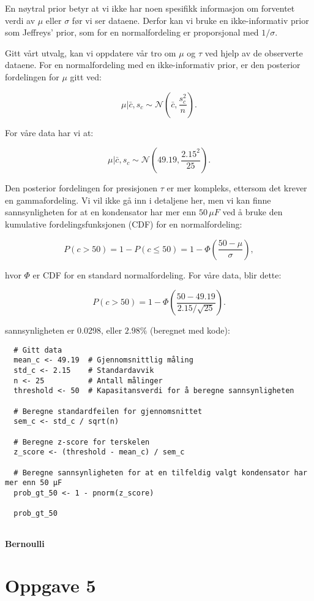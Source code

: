 \documentclass{article}
\begin{document}
En nøytral prior betyr at vi ikke har noen spesifikk informasjon om forventet verdi av \(\mu\) eller \(\sigma\) før vi ser dataene. Derfor kan vi bruke en ikke-informativ prior som Jeffreys' prior, som for en normalfordeling er proporsjonal med \(1/\sigma\).

Gitt vårt utvalg, kan vi oppdatere vår tro om \(\mu\) og \(\tau\) ved hjelp av de observerte dataene. For en normalfordeling med en ikke-informativ prior, er den posterior fordelingen for \(\mu\) gitt ved:

\[
\mu | \bar{c}, s_c \sim \mathcal{N}\left(\bar{c}, \frac{s_c^2}{n}\right).
\]

For våre data har vi at:

\[
\mu | \bar{c}, s_c \sim \mathcal{N}\left(49.19, \frac{2.15^2}{25}\right).
\]

Den posterior fordelingen for presisjonen \(\tau\) er mer kompleks, ettersom det krever en gammafordeling. Vi vil ikke gå inn i detaljene her, men vi kan finne sannsynligheten for at en kondensator har mer enn \(50 \, \mu F\) ved å bruke den kumulative fordelingsfunksjonen (CDF) for en normalfordeling:

\[
P(c > 50) = 1 - P(c \leq 50) = 1 - \Phi\left(\frac{50 - \mu}{\sigma}\right),
\]

hvor \(\Phi\) er CDF for en standard normalfordeling. For våre data, blir dette:

\[
P(c > 50) = 1 - \Phi\left(\frac{50 - 49.19}{2.15/\sqrt{25}}\right).
\]

sannsynligheten er 0.0298, eller \(2.98 \%\) (beregnet med kode):
\begin{verbatim}
  # Gitt data
  mean_c <- 49.19  # Gjennomsnittlig måling
  std_c <- 2.15    # Standardavvik
  n <- 25          # Antall målinger
  threshold <- 50  # Kapasitansverdi for å beregne sannsynligheten
  
  # Beregne standardfeilen for gjennomsnittet
  sem_c <- std_c / sqrt(n)
  
  # Beregne z-score for terskelen
  z_score <- (threshold - mean_c) / sem_c
  
  # Beregne sannsynligheten for at en tilfeldig valgt kondensator har mer enn 50 µF
  prob_gt_50 <- 1 - pnorm(z_score)
  
  prob_gt_50
  
  \end{verbatim}
  
  \newpage
\bf{Bernoulli}
\section{Oppgave 5}
\end{document}
